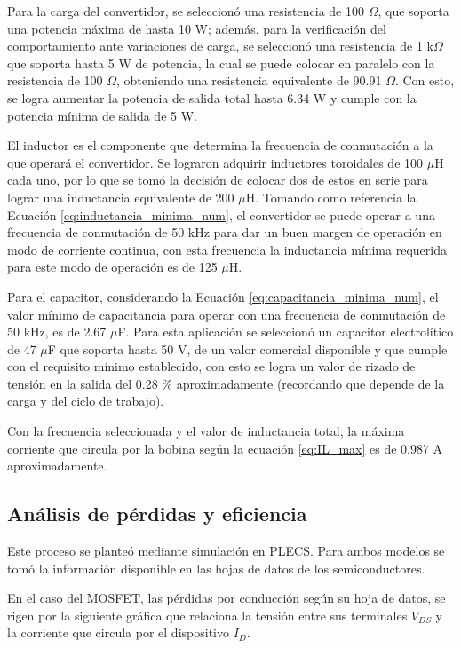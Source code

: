 \documentclass[conference]{IEEEtran}
\begin{document}
Para la carga del convertidor, se seleccionó una resistencia de 100 $\Omega$, que soporta una potencia máxima de hasta
10 W; además, para la verificación del comportamiento ante variaciones de carga, se seleccionó una resistencia 
de 1 k$\Omega$ que soporta hasta 5 W de potencia, la cual se puede colocar en paralelo con la resistencia de 100 $\Omega$,
obteniendo una resistencia equivalente de 90.91 $\Omega$. Con esto, se logra aumentar la potencia de salida total hasta 
6.34 W y cumple con la potencia mínima de salida de 5 W. 

El inductor es el componente que determina la frecuencia de conmutación a la que operará el convertidor. Se lograron
adquirir inductores toroidales de 100 $\mu$H cada uno, por lo que se tomó la decisión de colocar dos de estos en serie para lograr
una inductancia equivalente de 200 $\mu$H. Tomando como referencia la Ecuación \ref{eq:inductancia_minima_num}, el convertidor se 
puede operar a una frecuencia de conmutación de 50 kHz para dar un buen margen de operación en modo de corriente continua, con esta 
frecuencia la inductancia mínima requerida para este modo de operación es de 125 $\mu$H.

Para el capacitor, considerando la Ecuación \ref{eq:capacitancia_minima_num}, el valor mínimo de capacitancia para operar con una frecuencia de conmutación de 50 kHz, 
es de 2.67 $\mu$F. Para esta aplicación se seleccionó un capacitor electrolítico de 47 $\mu$F que soporta hasta 50 V, de un valor comercial disponible y que cumple con el requisito mínimo establecido,
con esto se logra un valor de rizado de tensión en la salida del 0.28 \% aproximadamente (recordando que depende de la carga y del ciclo de trabajo).

Con la frecuencia seleccionada y el valor de inductancia total, la máxima corriente que circula por la bobina según la 
ecuación \ref{eq:IL_max} es de 0.987 A aproximadamente. 

\subsection{Análisis de pérdidas y eficiencia}
Este proceso se planteó mediante simulación en PLECS. Para ambos modelos se tomó la información disponible en las hojas de 
datos de los semiconductores. 

En el caso del MOSFET, las pérdidas por conducción según su hoja de datos, se rigen por la siguiente gráfica que relaciona 
la tensión entre sus terminales $V_{DS}$ y la corriente que circula por el dispositivo $I_D$.
\end{document}
